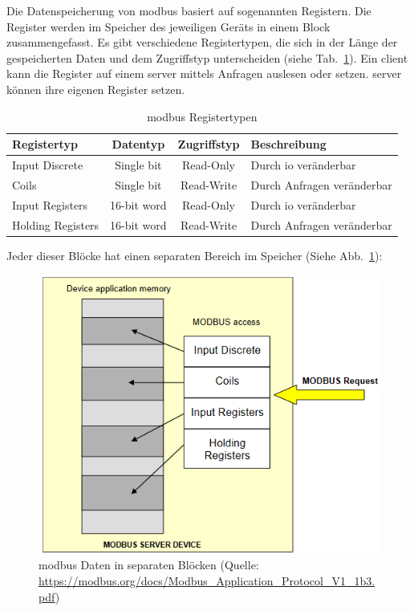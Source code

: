 Die Datenspeicherung von \gls{modbus} basiert auf sogenannten Registern. Die Register werden im Speicher des jeweiligen Geräts in einem Block zusammengefasst. Es gibt verschiedene Registertypen, die sich in der Länge der gespeicherten Daten und dem Zugriffstyp unterscheiden (siehe Tab.~\ref{tab:modbus_register}). \newline Ein \gls{client} kann die Register auf einem \gls{server} mittels Anfragen auslesen oder setzen. \gls{server} können ihre eigenen Register setzen.
\begin{table}[H]
	\caption{\gls{modbus} Registertypen \label{tab:modbus_register}}
	\begin{tabularx}{\textwidth}{@{}l|c|c|X@{}}
		\toprule
		\textbf{Registertyp} & \textbf{Datentyp} & \textbf{Zugriffstyp} & \textbf{Beschreibung} \\
		\midrule
		Input Discrete & Single bit & Read-Only & Durch \acf{io} veränderbar \\
		Coils & Single bit & Read-Write & Durch Anfragen veränderbar \\
		Input Registers & 16-bit word & Read-Only & Durch \acs{io} veränderbar \\
		Holding Registers & 16-bit word & Read-Write & Durch Anfragen veränderbar \\
		\bottomrule
	\end{tabularx}
\end{table} 
\cite[vgl.][]{IPC2U_GmbH:o.J.}

Jeder dieser Blöcke hat einen separaten Bereich im Speicher (Siehe Abb.~\ref{fig:modbus_register_many_blocks}):
\begin{figure}[H]
	\centering
	\includegraphics[width=0.4\linewidth]{Bilder/Modbus_Data_Model_with_separate_block}
	\caption{\gls{modbus} Daten in separaten Blöcken (Quelle: \url{https://modbus.org/docs/Modbus_Application_Protocol_V1_1b3.pdf})}
	\label{fig:modbus_register_many_blocks}
\end{figure}

